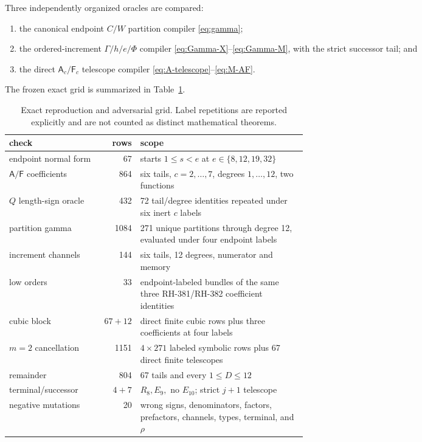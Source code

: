 \documentclass[11pt]{article}
\theoremstyle{definition}
\theoremstyle{remark}
\newcommand{\Afun}{\mathsf A}
\newcommand{\Ffun}{\mathsf F}
\begin{document}
Three independently organized oracles are compared:
\begin{enumerate}[leftmargin=2em]
 \item the canonical endpoint $C/W$ partition compiler
       \eqref{eq:gamma};
 \item the ordered-increment $\Gamma/h/e/\Phi$ compiler
       \eqref{eq:Gamma-X}--\eqref{eq:Gamma-M}, with the strict successor
       tail; and
 \item the direct $\Afun_c/\Ffun_c$ telescope compiler
       \eqref{eq:A-telescope}--\eqref{eq:M-AF}.
\end{enumerate}
The frozen exact grid is summarized in Table~\ref{tab:protocol}.

\begin{table}[ht]
\centering
\small
\begin{tabular}{@{}lrp{0.57\linewidth}@{}}
\toprule
check & rows & scope \\
\midrule
endpoint normal form & 67 & starts $1\le s<e$ at $e\in\{8,12,19,32\}$ \\
$\Afun/\Ffun$ coefficients & 864 & six tails, $c=2,\ldots,7$, degrees $1,\ldots,12$, two functions \\
$Q$ length-sign oracle & 432 & 72 tail/degree identities repeated under six inert $c$ labels \\
partition gamma & 1084 & 271 unique partitions through degree 12, evaluated under four endpoint labels \\
increment channels & 144 & six tails, 12 degrees, numerator and memory \\
low orders & 33 & endpoint-labeled bundles of the same three RH-381/RH-382 coefficient identities \\
cubic block & $67+12$ & direct finite cubic rows plus three coefficients at four labels \\
$m=2$ cancellation & 1151 & $4\times271$ labeled symbolic rows plus 67 direct finite telescopes \\
remainder & 804 & 67 tails and every $1\le D\le12$ \\
terminal/successor & $4+7$ & $R_8,E_9,$ no $E_{10}$; strict $j+1$ telescope \\
negative mutations & 20 & wrong signs, denominators, factors, prefactors, channels, types, terminal, and $\rho$ \\
\bottomrule
\end{tabular}
\caption{Exact reproduction and adversarial grid.  Label repetitions are
reported explicitly and are not counted as distinct mathematical theorems.}
\label{tab:protocol}
\end{table}
\end{document}
